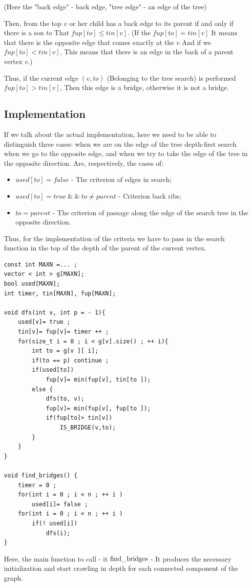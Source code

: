 (Here the "back edge" - back edge, "tree edge" - an edge of the tree)

Then, from the top $v$ or her child has a back edge to its parent if and only if there is a son $to$ That $fup [to] \le tin [v]$. (If the $fup [to] = tin [v]$ It means that there is the opposite edge that comes exactly at the $v$ And if we $fup [to] <tin [v]$, This means that there is an edge in the back of a parent vertex $v$.)

Thus, if the current edge $(v, to)$ (Belonging to the tree search) is performed $fup [to]> tin [v]$, Then this edge is a bridge, otherwise it is not a bridge.

\subsection{ Implementation }

If we talk about the actual implementation, here we need to be able to distinguish three cases: when we are on the edge of the tree depth-first search when we go to the opposite edge, and when we try to take the edge of the tree in the opposite direction. Are, respectively, the cases of:

\begin{itemize}
\item $used [to] = false$ - The criterion of edges in search;
\item $used [to] = true\ \&\ \&\ to \ne parent$ - Criterion back ribs;
\item $to = parent$ - The criterion of passage along the edge of the search tree in the opposite direction.
\end{itemize}

Thus, for the implementation of the criteria we have to pass in the search function in the top of the depth of the parent of the current vertex.

\begin{verbatim}
const int MAXN =... ;
vector < int > g[MAXN];
bool used[MAXN];
int timer, tin[MAXN], fup[MAXN];
 
void dfs(int v, int p = - 1){
    used[v]= true ;
    tin[v]= fup[v]= timer ++ ;
    for(size_t i = 0 ; i < g[v].size() ; ++ i){
        int to = g[v ][ i];
        if(to == p) continue ;
        if(used[to])
            fup[v]= min(fup[v], tin[to ]);
        else {
            dfs(to, v);
            fup[v]= min(fup[v], fup[to ]);
            if(fup[to]> tin[v])
                IS_BRIDGE(v,to);
        }
    }
}
 
void find_bridges() {
    timer = 0 ;
    for(int i = 0 ; i < n ; ++ i )
        used[i]= false ;
    for(int i = 0 ; i < n ; ++ i )
        if(! used[i])
            dfs(i);
} 
\end{verbatim}
Here, the main function to call - it ${\rm find \_bridges}$ - It produces the necessary initialization and start crawling in depth for each connected component of the graph.

